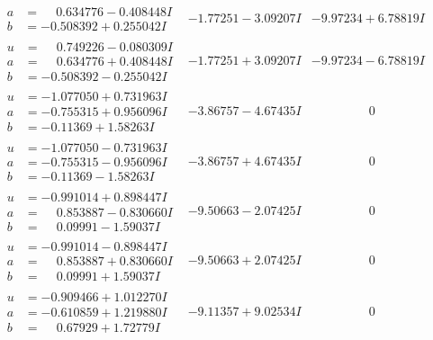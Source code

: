 \documentclass[1p]{elsarticle_modified}
\theoremstyle{definition}
\begin{document}
$$\begin{array}{c|c|c}
\begin{aligned}
a &= \phantom{-}0.634776 - 0.408448 I \\
b &= -0.508392 + 0.255042 I\end{aligned}
 & -1.77251 - 3.09207 I & -9.97234 + 6.78819 I \\ \hline\begin{aligned}
u &= \phantom{-}0.749226 - 0.080309 I \\
a &= \phantom{-}0.634776 + 0.408448 I \\
b &= -0.508392 - 0.255042 I\end{aligned}
 & -1.77251 + 3.09207 I & -9.97234 - 6.78819 I \\ \hline\begin{aligned}
u &= -1.077050 + 0.731963 I \\
a &= -0.755315 + 0.956096 I \\
b &= -0.11369 + 1.58263 I\end{aligned}
 & -3.86757 - 4.67435 I & \phantom{-0.000000 } 0 \\ \hline\begin{aligned}
u &= -1.077050 - 0.731963 I \\
a &= -0.755315 - 0.956096 I \\
b &= -0.11369 - 1.58263 I\end{aligned}
 & -3.86757 + 4.67435 I & \phantom{-0.000000 } 0 \\ \hline\begin{aligned}
u &= -0.991014 + 0.898447 I \\
a &= \phantom{-}0.853887 - 0.830660 I \\
b &= \phantom{-}0.09991 - 1.59037 I\end{aligned}
 & -9.50663 - 2.07425 I & \phantom{-0.000000 } 0 \\ \hline\begin{aligned}
u &= -0.991014 - 0.898447 I \\
a &= \phantom{-}0.853887 + 0.830660 I \\
b &= \phantom{-}0.09991 + 1.59037 I\end{aligned}
 & -9.50663 + 2.07425 I & \phantom{-0.000000 } 0 \\ \hline\begin{aligned}
u &= -0.909466 + 1.012270 I \\
a &= -0.610859 + 1.219880 I \\
b &= \phantom{-}0.67929 + 1.72779 I\end{aligned}
 & -9.11357 + 9.02534 I & \phantom{-0.000000 } 0 \\ \hline\begin{aligned}

\end{aligned}
\end{array}$$
\end{document}
